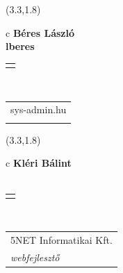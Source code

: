 \documentclass[11pt]{article}
\begin{document}
\makebox(3.3,1.8){
  \renewcommand\arraystretch{1.3}
  \begin{tabular}[c]{c}
    \hspace{8.5mm}
    \LARGE\bf{ Béres László }\\
    \hspace{8.5mm}
    \Large{ lberes }\\
    \renewcommand\arraystretch{3}
    \begin{tabular}[c]{c}
      \centering
      \fontfamily{phv}\selectfont{
        \textbf{
          \textsc{
            \scriptsize{
            \color{Dark}{ Ismerkedő }\color{Dark}{ Webmester }\color{Bright}{ Sminkmester }\color{Bright}{ Programozó }
            }
          }
        }
      }
    \end{tabular}
    \\
    \renewcommand\arraystretch{1}
    \begin{tabular}{p{3.3in}}
      \hspace{.7cm}sys-admin.hu\\
      \hspace{.7cm}\emph{  }\\
    \end{tabular}
  \end{tabular}
}

\makebox(3.3,1.8){
  \renewcommand\arraystretch{1.3}
  \begin{tabular}[c]{c}
    \hspace{8.5mm}
    \LARGE\bf{ Kléri Bálint }\\
    \hspace{8.5mm}
    \Large{  }\\
    \renewcommand\arraystretch{3}
    \begin{tabular}[c]{c}
      \centering
      \fontfamily{phv}\selectfont{
        \textbf{
          \textsc{
            \scriptsize{
            \color{Bright}{ Ismerkedő }\color{Bright}{ Webmester }\color{Bright}{ Sminkmester }\color{Dark}{ Programozó }
            }
          }
        }
      }
    \end{tabular}
    \\
    \renewcommand\arraystretch{1}
    \begin{tabular}{p{3.3in}}
      \hspace{.7cm}5NET Informatikai Kft.\\
      \hspace{.7cm}\emph{ webfejlesztő }\\
    \end{tabular}
  \end{tabular}
}
\end{document}
